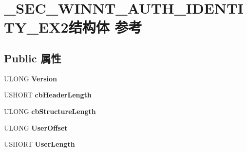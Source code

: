 \hypertarget{struct___s_e_c___w_i_n_n_t___a_u_t_h___i_d_e_n_t_i_t_y___e_x2}{}\section{\+\_\+\+S\+E\+C\+\_\+\+W\+I\+N\+N\+T\+\_\+\+A\+U\+T\+H\+\_\+\+I\+D\+E\+N\+T\+I\+T\+Y\+\_\+\+E\+X2结构体 参考}
\label{struct___s_e_c___w_i_n_n_t___a_u_t_h___i_d_e_n_t_i_t_y___e_x2}
\subsection*{Public 属性}
\begin{DoxyCompactItemize}
\item 
\mbox{\label{struct___s_e_c___w_i_n_n_t___a_u_t_h___i_d_e_n_t_i_t_y___e_x2_a60c03f2d87a0f0bf59a9506e6985d83d}} 
U\+L\+O\+NG {\bfseries Version}
\item 
\mbox{\label{struct___s_e_c___w_i_n_n_t___a_u_t_h___i_d_e_n_t_i_t_y___e_x2_a3fac90270aa56aad507ad84b2f847b50}} 
U\+S\+H\+O\+RT {\bfseries cb\+Header\+Length}
\item 
\mbox{\label{struct___s_e_c___w_i_n_n_t___a_u_t_h___i_d_e_n_t_i_t_y___e_x2_a13e780d368d3d0d1a0715f3bf730e3a0}} 
U\+L\+O\+NG {\bfseries cb\+Structure\+Length}
\item 
\mbox{\label{struct___s_e_c___w_i_n_n_t___a_u_t_h___i_d_e_n_t_i_t_y___e_x2_a36f5cf3c45717c1c2c32dabfe631f451}} 
U\+L\+O\+NG {\bfseries User\+Offset}
\item 
\mbox{\label{struct___s_e_c___w_i_n_n_t___a_u_t_h___i_d_e_n_t_i_t_y___e_x2_a505c95f05d2c5142e5f49689b718b808}} 
U\+S\+H\+O\+RT {\bfseries User\+Length}
\item 
\mbox{\label{struct___s_e_c___w_i_n_n_t___a_u_t_h___i_d_e_n_t_i_t_y___e_x2_a5ed8b29542a52660ca093cbbeeeb951c}} 

\end{DoxyCompactItemize}
